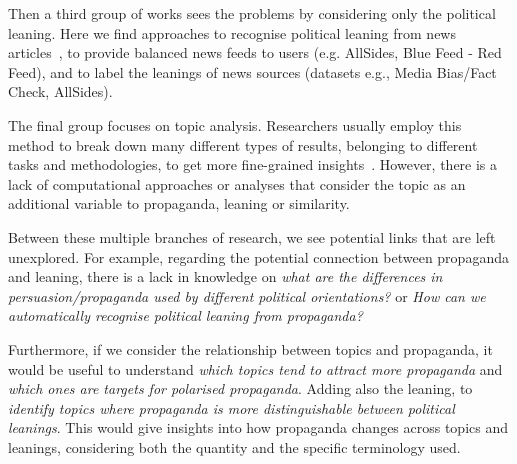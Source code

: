 Then a third group of works sees the problems by considering only the political leaning. Here we find approaches to recognise political leaning from news articles~\citep{baly2020we}, to provide balanced news feeds to users (e.g. AllSides, Blue Feed - Red Feed), and to label the leanings of news sources (datasets e.g., Media Bias/Fact Check, AllSides).

The final group focuses on topic analysis. Researchers usually employ this method to break down many different types of results, belonging to different tasks and methodologies, to get more fine-grained insights~\citep{zhang2023strategic}.
However, there is a lack of computational approaches or analyses that consider the topic as an additional variable to propaganda, leaning or similarity.


Between these multiple branches of research, we see potential links that are left unexplored.
For example, regarding the potential connection between propaganda and leaning, there is a lack in knowledge on \emph{what are the differences in persuasion/propaganda used by different political orientations?} or \emph{How can we automatically recognise political leaning from propaganda?}

Furthermore, if we consider the relationship between topics and propaganda, it would be useful to understand \emph{which topics tend to attract more propaganda} and \emph{which ones are targets for polarised propaganda}. Adding also the leaning, to \emph{identify topics where propaganda is more distinguishable between political leanings}.
This would give insights into how propaganda changes across topics and leanings, considering both the quantity and the specific terminology used.



